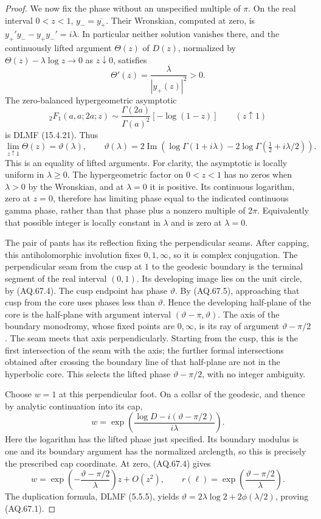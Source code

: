 \documentclass[11pt,a4paper]{article}
\theoremstyle{definition}\newtheorem{definition}[theorem]{Definition}
\theoremstyle{remark}\newtheorem{remark}[theorem]{Remark}
\begin{document}
\begin{proof}
We now fix the phase without an unspecified multiple of $\pi$.
On the real interval $0<z<1$, $y_- =\overline{y_+}$.
Their Wronskian, computed at zero, is
$y_+'y_- -y_+y_-'=i\lambda$. In particular neither solution
vanishes there, and the continuously lifted argument $\Theta(z)$
of $D(z)$, normalized by
$\Theta(z)-\lambda\log z\longrightarrow0$ as $z\downarrow0$,
satisfies
\[
 \Theta'(z)=\frac{\lambda}{|y_+(z)|^2}>0.
                                                               \tag{AQ.67.5}
\]
The zero-balanced hypergeometric asymptotic
\[
 {}_2F_1(a,a;2a;z)
   \sim\frac{\Gamma(2a)}{\Gamma(a)^2}[-\log(1-z)]
       \qquad (z\uparrow1)
\]
is DLMF (15.4.21). Thus
\[
 \lim_{z\uparrow1}\Theta(z)=\vartheta(\lambda),\qquad
 \vartheta(\lambda)=2\operatorname{Im}
       \left(\log\Gamma(1+i\lambda)
                    -2\log\Gamma(\tfrac12+i\lambda/2)\right).
                                                               \tag{AQ.67.6}
\]
This is an equality of lifted arguments. For clarity, the
asymptotic is locally uniform in $\lambda\geq0$. The hypergeometric
factor on $0<z<1$ has no zeros when $\lambda>0$ by the Wronskian,
and at $\lambda=0$ it is positive. Its continuous logarithm,
zero at $z=0$, therefore has limiting phase equal to the indicated
continuous gamma phase, rather than that phase plus a nonzero
multiple of $2\pi$. Equivalently that possible integer is locally
constant in $\lambda$ and is zero at $\lambda=0$.

The pair of pants has its reflection fixing the perpendicular
seams. After capping, this antiholomorphic involution fixes
$0,1,\infty$, so it is complex conjugation. The perpendicular
seam from the cusp at $1$ to the geodesic boundary is the terminal
segment of the real interval $(0,1)$. Its developing image lies
on the unit circle, by (AQ.67.4). The cusp endpoint has phase
$\vartheta$. By (AQ.67.5), approaching that cusp from the core
uses phases less than $\vartheta$. Hence the developing half-plane
of the core is the half-plane with argument interval
$(\vartheta-\pi,\vartheta)$. The axis of the boundary monodromy,
whose fixed points are $0,\infty$, is its ray of argument
$\vartheta-\pi/2$. The seam meets that axis perpendicularly.
Starting from the cusp, this is the first intersection of the
seam with the axis; the further formal intersections obtained
after crossing the boundary line of that half-plane are not in
the hyperbolic core. This selects the lifted phase
$\vartheta-\pi/2$, with no integer ambiguity.

Choose $w=1$ at this perpendicular foot. On a collar of the
geodesic, and thence by analytic continuation into its cap,
\[
 w=\exp\left(\frac{\log D-i(\vartheta-\pi/2)}{i\lambda}\right).
\]
Here the logarithm has the lifted phase just specified.
Its boundary modulus is one and its boundary argument has the
normalized arclength, so this is precisely the prescribed cap
coordinate. At zero, (AQ.67.4) gives
\[
 w=\exp\left(-\frac{\vartheta-\pi/2}{\lambda}\right)z+O(z^2),
 \qquad
 r(\ell)=\exp\left(\frac{\vartheta-\pi/2}{\lambda}\right).
                                                               \tag{AQ.67.7}
\]
The duplication formula, DLMF (5.5.5), yields
$\vartheta=2\lambda\log2+2\phi(\lambda/2)$, proving
(AQ.67.1).


\end{proof}
\end{document}
